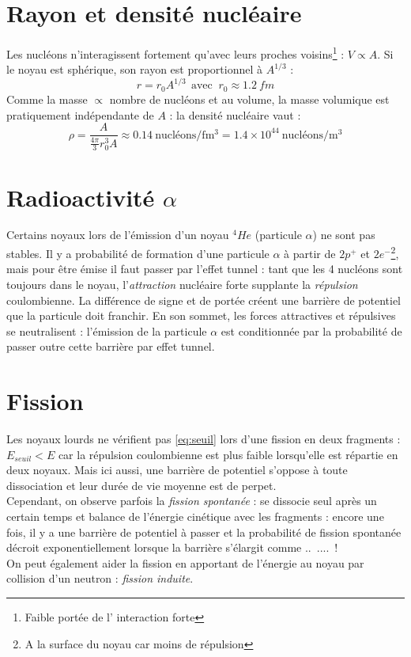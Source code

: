 \documentclass[british,french,11pt, a4paper, openany]{book}
\begin{document}
\section{Rayon et densité nucléaire}
Les nucléons n'interagissent fortement qu'avec leurs proches voisins\footnote{Faible portée de l'
	interaction forte} : $V \propto A$. Si le noyau est sphérique, son rayon est proportionnel à $A^{
	1/3}$ :
\begin{equation}
	r = r_0A^{1/3}\ \ \text{avec }\ r_0 \approx 1.2\ fm
\end{equation}
Comme la masse $\propto$ nombre de nucléons et au volume, la masse volumique est pratiquement indépendante
de $A$ : la densité nucléaire vaut : 
\begin{equation}
	\rho = \frac{A}{\frac{4\pi}{3}r_0^3A}\approx 0.14\ \text{nucléons/fm$^3$} = 1.4\times
	10^{44}\ \text{nucléons/m$^3$}
\end{equation}

\section{Radioactivité $\alpha$}
Certains noyaux lors de l'émission d'un noyau $^4He$ (particule $\alpha$) ne sont pas stables. Il 
y a probabilité de formation d'une particule $\alpha$ à partir  de $2 p^+$ et $2 e^-$\footnote{A la 
	surface du noyau car moins de répulsion}, mais pour être émise il faut passer par l'effet tunnel : 
tant que les 4 nucléons sont toujours dans le noyau, l'\textit{attraction} nucléaire forte supplante 
la \textit{répulsion} coulombienne. La différence de signe et de portée créent une barrière de 
potentiel que la particule doit franchir. En son sommet, les forces attractives et répulsives se 
neutralisent : l'émission de la particule $\alpha$ est conditionnée par la probabilité de passer outre
cette barrière par effet tunnel.

\section{Fission}
Les noyaux lourds ne vérifient pas \autoref{eq:seuil} lors d'une fission en deux fragments : $E_{
	seuil} < E$ car la répulsion coulombienne est plus faible lorsqu'elle est répartie en deux noyaux.
Mais ici aussi, une barrière de potentiel s'oppose à toute dissociation et leur durée de vie moyenne
est de perpet.\\

Cependant, on observe parfois la \textit{fission spontanée} : se dissocie seul après un certain temps
et balance de l'énergie cinétique avec les fragments : encore une fois, il y a une barrière de 
potentiel à passer et la probabilité de fission spontanée décroit exponentiellement lorsque la 
barrière s'élargit comme ..\ ....\ !\\
On peut également aider la fission en apportant de l'énergie au noyau par collision d'un neutron : 
\textit{fission induite}.
\end{document}
